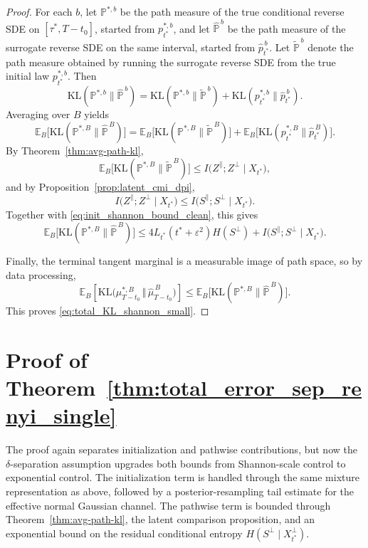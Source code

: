\documentclass[twoside,11pt]{article}
\newcommand{\E}{\mathbb{E}}
\newcommand{\PP}{\mathbb{P}}
\newcommand{\KL}{\mathrm{KL}}
\numberwithin{equation}{section}
\begin{document}
\begin{proof}
For each \(b\), let \(\PP^{*,b}\) be the path measure of the true conditional reverse SDE on
\([\tau^*,T-t_0]\), started from \(p_{t^*}^{*,b}\), and let \(\hat{\PP}^{\,b}\) be the path
measure of the surrogate reverse SDE on the same interval, started from \(\hat p_{t^*}^{\,b}\).
Let \(\tilde{\PP}^{\,b}\) denote the path measure obtained by running the surrogate reverse
SDE from the true initial law \(p_{t^*}^{*,b}\). Then
\[
\KL(\PP^{*,b}\|\hat{\PP}^{\,b})
=
\KL(\PP^{*,b}\|\tilde{\PP}^{\,b})
+
\KL(p_{t^*}^{*,b}\|\hat p_{t^*}^{\,b}).
\]
Averaging over \(B\) yields
\[
\E_B\!\big[\KL(\PP^{*,B}\|\hat{\PP}^{\,B})\big]
=
\E_B\!\big[\KL(\PP^{*,B}\|\tilde{\PP}^{\,B})\big]
+
\E_B\!\big[\KL(p_{t^*}^{*,B}\|\hat p_{t^*}^{\,B})\big].
\]
By Theorem~\ref{thm:avg-path-kl},
\[
\E_B\!\big[\KL(\PP^{*,B}\|\tilde{\PP}^{\,B})\big]
\le
I\!\big(Z^\parallel;Z^\perp\mid X_{t^*}\big),
\]
and by Proposition~\ref{prop:latent_cmi_dpi},
\[
I\!\big(Z^\parallel;Z^\perp\mid X_{t^*}\big)
\le
I\!\big(S^\parallel;S^\perp\mid X_{t^*}\big).
\]
Together with \eqref{eq:init_shannon_bound_clean}, this gives
\[
\E_B\!\big[\KL(\PP^{*,B}\|\hat{\PP}^{\,B})\big]
\le
4L_{t^*}(t^*+\varepsilon^2)H(S^\perp)
+
I\!\big(S^\parallel;S^\perp\mid X_{t^*}\big).
\]

Finally, the terminal tangent marginal is a measurable image of path space, so by data
processing,
\[
\E_B\!\left[\KL\!\big(\mu_{T-t_0}^{*,B}\,\Vert\,\hat\mu_{T-t_0}^{\,B}\big)\right]
\le
\E_B\!\big[\KL(\PP^{*,B}\|\hat{\PP}^{\,B})\big].
\]
This proves \eqref{eq:total_KL_shannon_small}.
\end{proof}


\section{Proof of Theorem~\ref{thm:total_error_sep_renyi_single}}

\noindent
The proof again separates initialization and pathwise contributions, but now the
\(\delta\)-separation assumption upgrades both bounds from Shannon-scale control to
exponential control. The initialization term is handled through the same mixture
representation as above, followed by a posterior-resampling tail estimate for the effective
normal Gaussian channel. The pathwise term is bounded through
Theorem~\ref{thm:avg-path-kl}, the latent comparison proposition, and an exponential bound
on the residual conditional entropy \(H(S^\perp\mid X_{t^*}^\perp)\).
\end{document}
